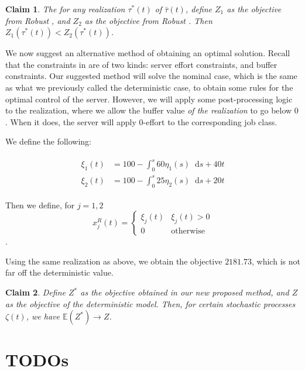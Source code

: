 \documentclass[11pt,a4paper,titlepage]{article}
\newcommand*{\dd}{\ensuremath{\mathop{}\!\mathrm{d}}}%
\theoremstyle{definition}
\theoremstyle{plain}
\newtheorem{claim}{Claim}
\begin{document}
\begin{claim}
    The for any realization $\tau^*(t)$ of $\bar{\tau}(t)$,
    define $Z_1$ as the objective from Robust \modelone,
    and $Z_2$ as the objective from Robust \modeltwo.
    Then $Z_1(\tau^*(t)) < Z_2(\tau^*(t))$.
\end{claim}

We now suggest an alternative method of obtaining an optimal solution.
Recall that the constraints in 
are of two kinds:
server effort constraints,
and buffer constraints.
Our suggested method will solve the nominal case,
which is the same as what we previously called the deterministic case,
to obtain some rules for the optimal control of the server.
However,
we will apply some post-processing logic to the realization,
where we allow the buffer value \textit{of the realization}
to go below $0$.
When it does,
the server will apply $0$-effort to the corresponding job class.

We define the following:

\begin{align}
\begin{split}
    \xi_1(t) & = 100 - \int_0^s 60 \eta_1(s) \dd s  + 40t \\
    \xi_2(t) & = 100 - \int_0^s 25 \eta_2(s) \dd s  + 20t
\end{split}
\end{align}

Then we define, for $j=1,2$
\begin{equation}
    x_j^R(t) =
    \begin{cases}
        \xi_j(t) & \xi_j(t) > 0 \\
        0 & \text{otherwise}
    \end{cases}
\end{equation}.

Using the same realization as above,
we obtain the objective $2181.73$,
which is not far off the deterministic value.

\begin{claim}
    Define $Z^*$ as the objective obtained in our new proposed method,
    and $Z$ as the objective of the deterministic model.
    Then,
    for certain stochastic processes $\zeta(t)$,
    we have $\mathbb{E}(Z^*) \to Z$.
\end{claim}


\section{TODOs}
\end{document}
